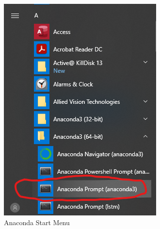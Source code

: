 \begin{figure}[H]
	\centering
	\begin{subfigure}[b]{0.38\textwidth}
		\includegraphics[width=\textwidth]{Figures/Anaconda_Prompt.png}
		\caption{Anaconda Start Menu}
		\label{AnacondaMenu}
	\end{subfigure}
	\hfill
	\begin{subfigure}[b]{0.52\textwidth}

\end{subfigure}
\end{figure}
